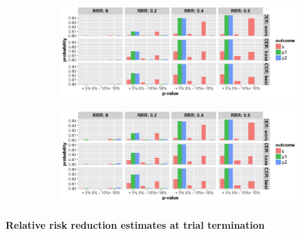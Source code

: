 \documentclass[]{article}
\let\oldparagraph\paragraph
\renewcommand{\paragraph}[1]{\oldparagraph{#1}\mbox{}}
\begin{document}
\begin{figure}
\centering
  \caption{Probability that the p-value (from Fisher’s exact test) at termination of the trial is below 5\%, between 5\%
  and 10\% and greater than 10\% for cases where trial was stopped for superiority of (a) B.I or (b) L.P. The rows
  represent the three control even rate scenarios and the four columns present four relative risk reduction scenarios.
  Note: In the figures below, the denominator in each figure is the number of simulations (not the number of trials
  stopped for futility or superiority, and thus, the proportions do not add up to 100%
  figures do not include simulations where the trial went to the maximum allowed sample size. The bars should be
  interpreted with respect to the relative proportion that fit in each category.}
  \begin{subfigure}{0.8\textwidth}
    \centering
    \caption{}
    \includegraphics{../plots/3arm/p_value_supbi_3arm.png}
  \end{subfigure}
  \bigbreak
  \begin{subfigure}{0.8\textwidth}
    \centering
    \caption{}
    \includegraphics{../plots/3arm/p_value_suplp_3arm.png}
  \end{subfigure}
\end{figure}

\hypertarget{relative-risk-reduction-estimates-at-trial-termination-1}{%
\paragraph{Relative risk reduction estimates at trial
termination}\label{relative-risk-reduction-estimates-at-trial-termination-1}}
\end{document}
